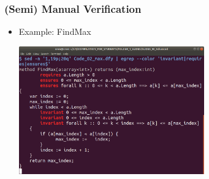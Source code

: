 
\begin{frame}

\frametitle{(Semi) Manual Verification}

\begin{itemize}

\item Example: FindMax
\begin{center}
\includegraphics[width=8cm]{FOLDER_3_IMG_FILES/Code_02_max_inv.png}
\end{center}

\end{itemize}

\end{frame}
